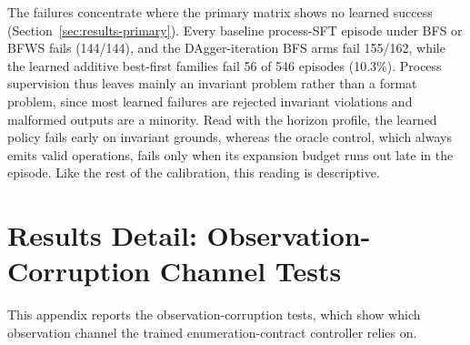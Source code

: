 The failures concentrate where the primary matrix shows no learned success (Section~\ref{sec:results-primary}). Every baseline process-SFT episode under BFS or BFWS fails (144/144), and the DAgger-iteration BFS arms fail 155/162, while the learned additive best-first families fail 56 of 546 episodes (10.3\%). Process supervision thus leaves mainly an invariant problem rather than a format problem, since most learned failures are rejected invariant violations and malformed outputs are a minority. Read with the horizon profile, the learned policy fails early on invariant grounds, whereas the oracle control, which always emits valid operations, fails only when its expansion budget runs out late in the episode. Like the rest of the calibration, this reading is descriptive.

\section{Results Detail: Observation-Corruption Channel Tests}
\label{app:results-corruption}
\label{sec:results-corruption}

This appendix reports the observation-corruption tests, which show which observation channel the trained enumeration-contract controller relies on.

